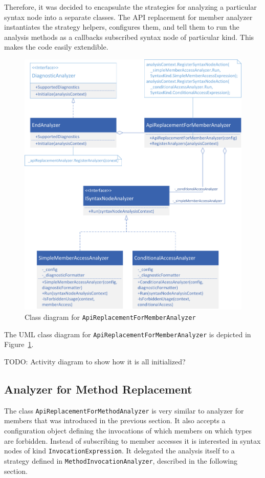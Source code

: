 \documentclass[
  digital, %
  table,   %
  lof,     %
  lot,     %
  oneside,
]{fithesis3}
\begin{document}
Therefore, it was decided to encapsulate the strategies for analyzing a particular syntax node into a separate classes. The API replacement for member analyzer instantiates the strategy helpers, configures them, and tell them to run the analysis methods as a callbacks subscribed syntax node of particular kind. This makes the code easily extendible.

\begin{figure}[h!]
		\centering
			\includegraphics[scale=0.75]{img/uml/api-replacement-for-member}
		\caption{Class diagram for \texttt{ApiReplacementForMemberAnalyzer}}
		\label{fig:uml-api-replacement-for-member}
\end{figure}

The UML class diagram for \texttt{ApiReplacementForMemberAnalyzer} is depicted in Figure~\ref{fig:uml-api-replacement-for-member}.

TODO: Activity diagram to show how it is all initialized?

\subsection{Analyzer for Method Replacement}
The class \texttt{ApiReplacementForMethodAnalyzer} is very similar to analyzer for members that was introduced in the previous section. It also accepts a configuration object defining the invocations of which members on which types are forbidden. 
Instead of subscribing to member accesses it is interested in syntax nodes of kind \texttt{InvocationExpression}. It delegated the analysis itself to a strategy defined in \texttt{MethodInvocationAnalyzer}, described in the following section.
\end{document}
